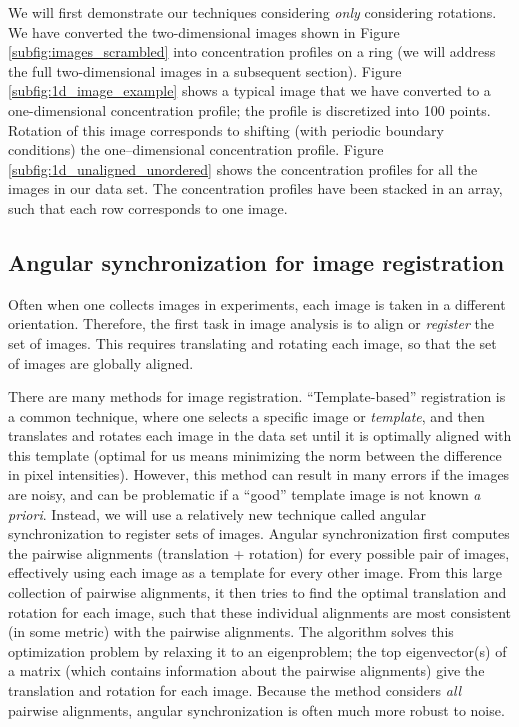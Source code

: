 \documentclass{pnastwo}
\begin{document}
\begin{article}
We will first demonstrate our techniques considering {\em only} considering rotations. 
%
We have converted the two-dimensional images shown in Figure \ref{subfig:images_scrambled} into concentration profiles on a ring (we will address the full two-dimensional images in a subsequent section).
%
Figure \ref{subfig:1d_image_example} shows a typical image that we have converted to a one-dimensional concentration profile; the profile is discretized into 100 points. 
%
Rotation of this image corresponds to shifting (with periodic boundary conditions) the one--dimensional concentration profile. 
%
Figure \ref{subfig:1d_unaligned_unordered} shows the concentration profiles for all the images in our data set. 
%
The concentration profiles have been stacked in an array, such that each row corresponds to one image.

\subsection{Angular synchronization for image registration}

Often when one collects images in experiments, each image is taken in a different orientation. 
%
Therefore, the first task in image analysis is to align or {\em register} the set of images. 
%
This requires translating and rotating each image, so that the set of images are globally aligned.

There are many methods for image registration. 
%
``Template-based'' registration \cite{ahuja2007template} is a common technique, where one selects a specific image or {\em template}, and then translates and rotates each image in the data set until it is optimally aligned with this template (optimal for us means minimizing the norm between the difference in pixel intensities).
%
However, this method can result in many errors if the images are noisy, and can be problematic if a ``good'' template image is not known {\em a priori}. 
%
Instead, we will use a relatively new technique called angular synchronization\cite{singer2011angular} to register sets of images.
%
Angular synchronization first computes the pairwise alignments (translation + rotation) for every possible pair of images, effectively using each image as a template for every other image.
%
From this large collection of pairwise alignments, it then tries to find the optimal translation and rotation for each image, such that these individual alignments are most consistent (in some metric) with the pairwise alignments.
%
The algorithm solves this optimization problem by relaxing it to an eigenproblem; the top eigenvector(s) of a matrix (which contains information about the pairwise alignments) give the translation and rotation for each image.
%
Because the method considers {\em all} pairwise alignments, angular synchronization is often much more robust to noise. 


\end{article}
\end{document}
